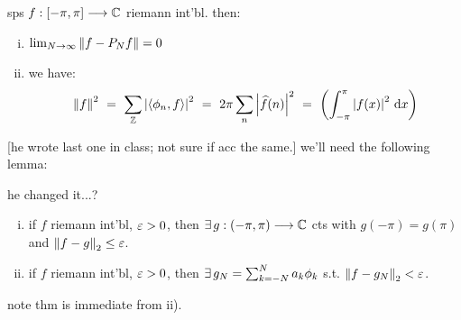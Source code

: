 \begin{thm}[title=Parseval/Plancherel]
	sps $f:[-\pi,\pi]\longrightarrow\mathbb{C}$ riemann int'bl. then:
	\begin{enumerate}[i)]
		\item $\lim_{N\rightarrow\infty}\left\|f-P_{N}f\right\|=0$
		\item we have:
			\begin{equation*}
				\norm{f}^{2} \ = \ \sum_{\bZ}\abs{\ang{\phi_{n},f}}^{2}
				\ = \ 2\pi\sum_{n}\abs{\hat{f}(n)}^{2}
				\ = \ \left(\int_{-\pi}^{\pi}\abs{f(x)}^{2}\di x\right)
			\end{equation*}
	\end{enumerate}
\end{thm}
[he wrote last one in class; not sure if acc the same.]
we'll need the following lemma:
\begin{lm}
	he changed it...?
	\begin{enumerate}[i)]
		\item if $f$ riemann int'bl, $\varepsilon>0$, then
			$\ex g:(-\pi,\pi)\gto\bC$ cts with $g(-\pi)=g(\pi)$ and
			$\left\|f-g\right\|_{2}\leq\varepsilon$.
		\item if $f$ riemann int'bl, $\varepsilon>0$, then
			$\ex g_{N}=\sum_{k=-N}^{N}a_{k}\phi_{k}$ s.t. $\left\|f-g_{N}\right\|_{2}<\varepsilon$.
	\end{enumerate}
\end{lm}
note thm is immediate from ii).

